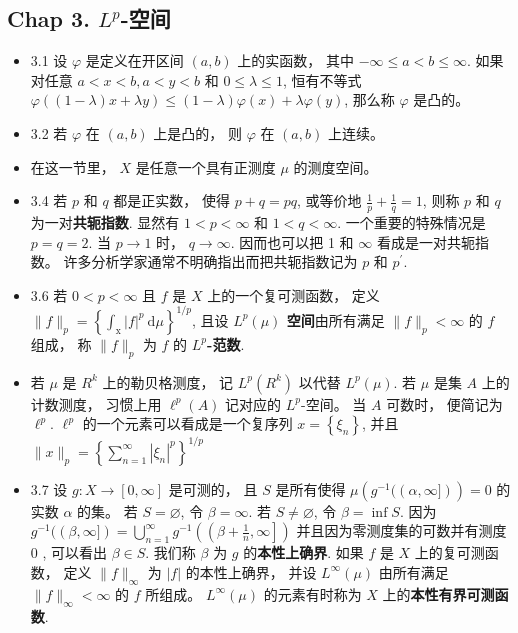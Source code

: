 \subsection{Chap 3. $L^p$-空间}

\begin{itemize}
\item 3.1 设 $\varphi$ 是定义在开区间 $(a, b)$ 上的实函数， 其中 $-\infty \leqslant a<b \leqslant \infty$. 如果对任意 $a<x<b, a<y<b$ 和 $0 \leqslant \lambda \leqslant 1$, 恒有不等式 $\varphi((1-\lambda) x+\lambda y) \leqslant(1-\lambda) \varphi(x)+\lambda \varphi(y)$, 那么称 $\varphi$ 是凸的。

\item 3.2 若 $\varphi$ 在 $(a, b)$ 上是凸的， 则 $\varphi$ 在 $(a, b)$ 上连续。

\item 在这一节里， $X$ 是任意一个具有正测度 $\mu$ 的测度空间。

\item 3.4 若 $p$ 和 $q$ 都是正实数， 使得 $p+q=p q$, 或等价地 $\frac{1}{p}+\frac{1}{q}=1$, 则称 $p$ 和 $q$ 为一对\textbf{共轭指数}. 显然有 $1<p<\infty$ 和 $1<q<\infty$. 一个重要的特殊情况是 $p=q=2$. 当 $p \rightarrow 1$ 时， $q \rightarrow \infty$. 因而也可以把 1 和 $\infty$ 看成是一对共轭指数。 许多分析学家通常不明确指出而把共轭指数记为 $p$ 和 $p^{\prime}$.

\item 3.6 若 $0<p<\infty$ 且 $f$ 是 $X$ 上的一个复可测函数， 定义 $\|f\|_{p}=\left\{\int_{\mathrm{x}}|f|^{p} \mathrm{~d} \mu\right\}^{1 / p}$, 且设 \textbf{$L^{p}(\mu)$ 空间}由所有满足 $\|f\|_{p}<\infty$ 的 $f$ 组成， 称 $\|f\|_{p}$ 为 $f$ 的 \textbf{$L^{p}$-范数}.

\item 若 $\mu$ 是 $R^{k}$ 上的勒贝格测度， 记 $L^{p}\left(R^{k}\right)$ 以代替 $L^{p}(\mu)$. 若 $\mu$ 是集 $A$ 上的计数测度， 习惯上用 $\ell^{p}(A)$ 记对应的 $L^{p}$-空间。 当 $A$ 可数时， 便简记为 $\ell^{p}$. $\ell^{p}$ 的一个元素可以看成是一个复序列 $x=\left\{\xi_{n}\right\}$, 并且 $\|x\|_{p}=\left\{\sum_{n=1}^{\infty}\left|\xi_{n}\right|^{p}\right\}^{1 / p}$

\item 3.7 设 $g: X \rightarrow[0, \infty]$ 是可测的， 且 $S$ 是所有使得 $\mu\left(g^{-1}((\alpha, \infty])\right)=0$ 的实数 $\alpha$ 的集。 若 $S=\varnothing$, 令 $\beta=\infty$. 若 $S \neq \varnothing$, 令 $\beta=\inf S$. 因为 $g^{-1}((\beta, \infty])=\bigcup_{n=1}^{\infty} g^{-1}\left(\left(\beta+\frac{1}{n}, \infty\right]\right)$ 并且因为零测度集的可数并有测度 0 , 可以看出 $\beta \in S$. 我们称 $\beta$ 为 $g$ 的\textbf{本性上确界}. 如果 $f$ 是 $X$ 上的复可测函数， 定义 $\|f\|_{\infty}$ 为 $|f|$ 的本性上确界， 并设 $L^{\infty}(\mu)$ 由所有满足 $\|f\|_{\infty}<\infty$ 的 $f$ 所组成。 $L^{\infty}(\mu)$ 的元素有时称为 $X$ 上的\textbf{本性有界可测函数}.


\end{itemize}
